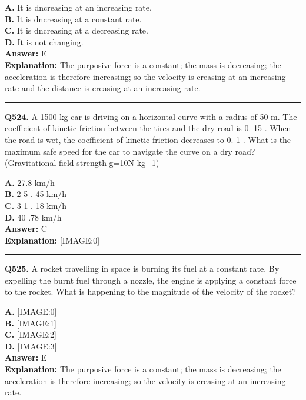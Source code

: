 \documentclass[12pt]{article}
\begin{document}
\textbf{A.} It is dncreasing at an increasing rate. \\
\textbf{B.} It is dncreasing at a constant rate. \\
\textbf{C.} It is dncreasing at a decreasing rate. \\
\textbf{D.} It is not changing. \\

\textbf{Answer:} E \\
\textbf{Explanation:} The purposive force is a constant; the mass is decreasing; the acceleration is therefore increasing; so the velocity is creasing at an increasing rate and the distance is creasing at an increasing rate.

\hrule
\vspace{1em}


\noindent
\textbf{Q524.} A 1500 kg car is driving on a horizontal curve with a radius of 50 m. The coefficient of kinetic friction between the tires and the dry road is 0.
15
. When the road is wet, the coefficient of kinetic friction decreases to 0.
1
. What is the maximum safe speed for the car to navigate the curve on a dry road? (Gravitational field strength g=10N kg−1)



\textbf{A.} 27.8
km/h \\
\textbf{B.} 2
5
.
45
km/h \\
\textbf{C.} 3
1
.
18
km/h \\
\textbf{D.} 40
.78
km/h \\

\textbf{Answer:} C \\
\textbf{Explanation:} [IMAGE:0]

\hrule
\vspace{1em}


\noindent
\textbf{Q525.} A rocket travelling in space is burning its fuel at a constant rate. By expelling the burnt fuel through a nozzle, the engine is applying a constant force to the rocket.
What is happening to the magnitude of the velocity of the rocket?



\textbf{A.} [IMAGE:0] \\
\textbf{B.} [IMAGE:1] \\
\textbf{C.} [IMAGE:2] \\
\textbf{D.} [IMAGE:3] \\

\textbf{Answer:} E \\
\textbf{Explanation:} The purposive force is a constant; the mass is decreasing; the acceleration is therefore increasing; so the velocity is creasing at an increasing rate.
\end{document}

